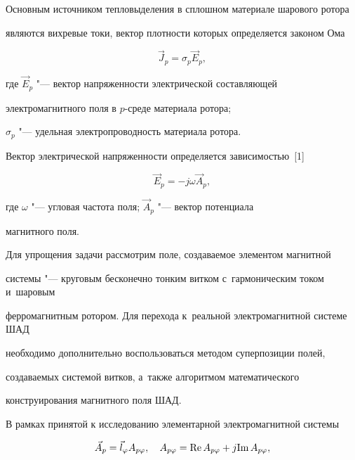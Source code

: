 Основным источником тепловыделения в сплошном материале шарового ротора

являются вихревые токи, вектор плотности которых определяется законом Ома

\begin{equation*}


 \vec J_p =\sigma _p \vec {E}_p,

\end{equation*}

где $\vec {E}_p $ "--- вектор напряженности электрической составляющей

электромагнитного поля в $p$-среде материала ротора;

$\sigma _p $ "--- удельная электропроводность материала ротора.

Вектор электрической напряженности определяется зависимостью~[1]

\begin{equation*}


\vec {E}_p =-j\omega \vec {A}_p ,

\end{equation*}

где $\omega $ "--- угловая частота поля; $\vec {A}_p $ "--- вектор потенциала

магнитного поля.



Для упрощения задачи рассмотрим поле, создаваемое элементом магнитной

системы "--- круговым бесконечно тонким витком с~гармоническим током и~шаровым

ферромагнитным ротором. Для перехода к~реальной электромагнитной системе ШАД

необходимо дополнительно воспользоваться методом суперпозиции полей,

создаваемых системой витков, а~также алгоритмом математического

конструирования магнитного поля ШАД.



В рамках принятой к исследованию элементарной электромагнитной системы

\begin{equation*}


\vec {A}_p =\vec {l}_\varphi A_{p\varphi },

\quad

A_{p\varphi } ={\rm Re\,}A_{p\varphi} +j{\rm Im\,}A_{p\varphi } ,

\end{equation*}

